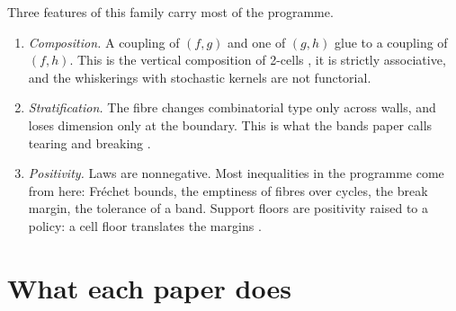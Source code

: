 \documentclass[11pt]{article}
\theoremstyle{definition}
\theoremstyle{remark}
\begin{document}
Three features of this family carry most of the programme.
\begin{enumerate}[label=(\alph*),leftmargin=*]
\item \emph{Composition.} A coupling of $(f,g)$ and one of $(g,h)$ glue to a coupling of $(f,h)$. This is the vertical composition of
  2-cells \cite[\S2]{Conditionals}, it is strictly associative, and the whiskerings with stochastic kernels are not functorial.
\item \emph{Stratification.} The fibre changes combinatorial type only across walls, and loses dimension only at the boundary. This is
  what the bands paper calls tearing and breaking \cite[Thm.~3.3]{Bands}.
\item \emph{Positivity.} Laws are nonnegative. Most inequalities in the programme come from here: Fréchet bounds, the emptiness of
  fibres over cycles, the break margin, the tolerance of a band.
  Support floors are positivity raised to a policy: a cell floor translates the margins \cite[Prop.~6.9]{Conditionals}.
\end{enumerate}

\section{What each paper does}\label{sec:papers}
\end{document}
